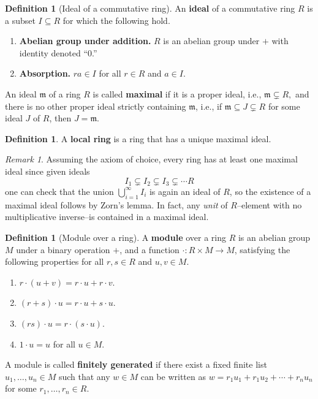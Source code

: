 \documentclass[12pt]{article}
\theoremstyle{definition}
\newtheorem{definition}[theorem]{Definition}
\theoremstyle{remark}
\newtheorem{remark}[theorem]{Remark}
\begin{document}
\begin{definition}[Ideal of a commutative ring]
An \textbf{ideal} of a commutative ring $R$ is a subset $I \subseteq R$ for which the following hold. 
\begin{enumerate}[topsep=0cm,itemsep=0cm]
\item \textbf{Abelian group under addition.}  $R$ is an abelian group under $+$ with identity denoted ``$0$.''
\item \textbf{Absorption.}  $r a \in I$ for all $r \in R$ and $a \in I$.
\end{enumerate}
An ideal $\mathfrak{m}$ of a ring $R$ is called \textbf{maximal} if it is  a proper ideal, i.e., $\mathfrak{m} \subsetneq R,$ and there is no other proper ideal strictly containing $\mathfrak{m}$, i.e., if $\mathfrak{m} \subseteq J \subsetneq R$ for some ideal $J$ of $R$, then $J = \mathfrak{m}$. 
\end{definition}



\begin{definition}
	A \textbf{local ring} is a ring that has a unique maximal ideal. 
\end{definition}

\begin{remark}
Assuming the axiom of choice, every ring has at least one maximal ideal since
given ideals
\[
I_1 \subsetneq I_2 \subsetneq I_3 \subsetneq \cdots R
\]
one can check that the union $\bigcup_{i=1}^\infty I_i$ is again an ideal of $R$, so the existence of a maximal ideal follows by Zorn's lemma.  In fact, any \emph{unit} of $R$--element with no multiplicative inverse--is contained in a maximal ideal. 
\end{remark}



\begin{definition}[Module over a ring]
A \textbf{module} over a ring $R$ is an abelian group $M$ under a binary operation $+$, and a function $\cdot: R \times M \to M$, satisfying the following properties for all $r, s \in R$ and $u, v \in M$.
\begin{enumerate}[topsep=0cm,itemsep=0cm]
\item  $r \cdot (u + v)  = r \cdot u + r \cdot v$.
\item $(r+s) \cdot u = r \cdot u + s \cdot u$.
\item $(rs) \cdot u = r \cdot (s \cdot u)$.
\item $1 \cdot u = u$ for all $u \in M$.
\end{enumerate}
A module is called \textbf{finitely generated} if there exist a fixed finite list $u_1, \ldots, u_n \in M$ such that any 
$w \in M$ can be written as 
$
w = r_1 u_1 + r_1 u_2 + \cdots + r_n u_n
$
for some $r_1, \ldots, r_n \in R$. 
\end{definition}
\end{document}
